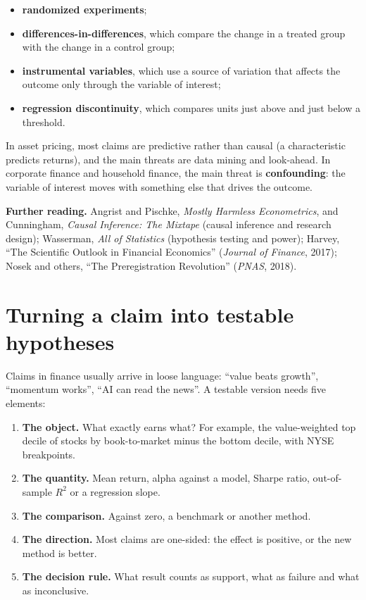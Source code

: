 \begin{itemize}
  \item \textbf{randomized experiments};
  \item \textbf{differences-in-differences}, which compare the change in a treated group with the change in a control group;
  \item \textbf{instrumental variables}, which use a source of variation that affects the outcome only through the variable of interest;
  \item \textbf{regression discontinuity}, which compares units just above and just below a threshold.
\end{itemize}

In asset pricing, most claims are predictive rather than causal (a characteristic predicts returns), and the main threats are data mining and look-ahead. In corporate finance and household finance, the main threat is \textbf{confounding}: the variable of interest moves with something else that drives the outcome.

\textbf{Further reading.} Angrist and Pischke, \emph{Mostly Harmless Econometrics}, and Cunningham, \emph{Causal Inference: The Mixtape} (causal inference and research design); Wasserman, \emph{All of Statistics} (hypothesis testing and power); Harvey, ``The Scientific Outlook in Financial Economics'' (\emph{Journal of Finance}, 2017); Nosek and others, ``The Preregistration Revolution'' (\emph{PNAS}, 2018).

\section{Turning a claim into testable hypotheses}
\label{sec:25-hypotheses}

Claims in finance usually arrive in loose language: ``value beats growth'', ``momentum works'', ``AI can read the news''. A testable version needs five elements:

\begin{enumerate}
  \item \textbf{The object.} What exactly earns what? For example, the value-weighted top decile of stocks by book-to-market minus the bottom decile, with NYSE breakpoints.
  \item \textbf{The quantity.} Mean return, alpha against a model, Sharpe ratio, out-of-sample $R^2$ or a regression slope.
  \item \textbf{The comparison.} Against zero, a benchmark or another method.
  \item \textbf{The direction.} Most claims are one-sided: the effect is positive, or the new method is better.
  \item \textbf{The decision rule.} What result counts as support, what as failure and what as inconclusive.
\end{enumerate}

